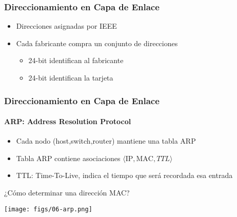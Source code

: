 \documentclass[letter]{beamer}
\begin{document}
\begin{frame}
  \frametitle{Direccionamiento en Capa de Enlace}

  \begin{itemize}
    \item Direcciones asignadas por IEEE
    \item Cada fabricante compra un conjunto de direcciones
      \begin{itemize}
        \item 24-bit identifican al fabricante
        \item 24-bit identifican la tarjeta
      \end{itemize}
  \end{itemize}

\end{frame}
\begin{frame}
  \frametitle{Direccionamiento en Capa de Enlace}
  \framesubtitle{ARP: Address Resolution Protocol}
  
  \begin{itemize}
    \item Cada nodo (host,switch,router) mantiene una tabla ARP
    \item Tabla ARP contiene asociaciones $\langle \text{IP},\text{MAC},TTL \rangle$
    \item TTL: Time-To-Live, indica el tiempo que será recordada esa entrada
  \end{itemize}
  ¿Cómo determinar una dirección MAC?
  \begin{center}
    \texttt{[image: figs/06-arp.png]}
  \end{center}
\end{frame}
\end{document}
